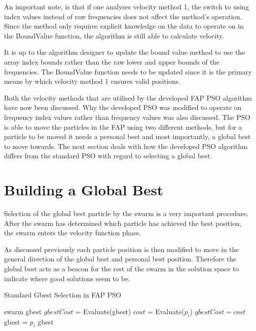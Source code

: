 An important note, is that if one analyses velocity method 1, the switch to using index values instead of raw frequencies does not affect the method's operation. Since the method only requires explicit knowledge on the data to operate on in the BoundValue function, the algorithm is still able to calculate velocity. 

It is up to the algorithm designer to update the bound value method to use the array index bounds rather than the raw lower and upper bounds of the frequencies. The BoundValue function needs to be updated since it is the primary means by which velocity method 1 ensures valid positions.

Both the velocity methods that are utilised by the developed \gls{FAP} \gls{PSO} algorithm have now been discussed. Why the developed \gls{PSO} was modified to operate on frequency index values rather than frequency values was also discussed. The \gls{PSO} is able to move the particles in the \gls{FAP} using two different methods, but for a particle to be moved it needs a personal best and most importantly, a global best to move towards. The next section deals with how the developed \gls{PSO} algorithm differs from the standard \gls{PSO} with regard to selecting a global best.
\section{Building a Global Best}
\label{sec:buildglobalbest}
Selection of the global best particle by the swarm is a very important procedure. After the swarm has determined which particle has achieved the best position, the swarm enters the velocity function phase. 

As discussed previously each particle position is then modified to move in the general direction of the global best and personal best position. Therefore the global best acts as a beacon for the rest of the swarm in the solution space to indicate where good solutions seem to be.

\begin{algorithm}
\caption{Standard Gbest Selection in FAP PSO }
\label{alg:psogbestselection}
\begin{algorithmic}[1]
\Require swarm
\Require gbest
\State $gbestCost$ = Evaluate(gbest)
	\State $cost$ = Evaluate($p_i$)
		\State $gbestCost = cost$
		\State gbest = $p_i$
	\EndIf
\EndFor
\Return gbest
\end{algorithmic}
\end{algorithm}


